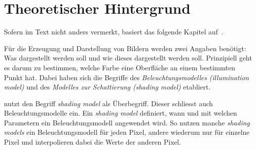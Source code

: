 
\chapter{Theoretischer Hintergrund}
\label{chap:theoretical_background}

Sofern im Text nicht anders vermerkt, basiert das folgende Kapitel
auf~\cite[S. 721ff]{foley_computer_1996}.

Für die Erzeugung und Darstellung von Bildern werden zwei Angaben
benötigt: Was dargestellt werden soll und wie dieses dargestellt werden
soll.
Prinzipiell geht es darum zu bestimmen, welche Farbe eine Oberfläche an
einem bestimmten Punkt hat. Dabei haben sich die Begriffe des
\textit{Beleuchtungsmodelles (illumination model)} und des
\textit{Modelles zur Schattierung (shading model)} etabliert.

\citeauthor{foley_computer_1996} nutzt den Begriff \textit{shading
model} als Überbegriff. Dieser schliesst auch Beleuchtungsmodelle ein.
Ein \textit{shading model} definiert, wann und mit welchen Parametern
ein Beleuchtungsmodell angewendet wird. So nutzen manche \textit{shading
models} ein Beleuchtungsmodell für jeden Pixel, andere wiederum nur für
einzelne Pixel und interpolieren dabei die Werte der anderen Pixel.



